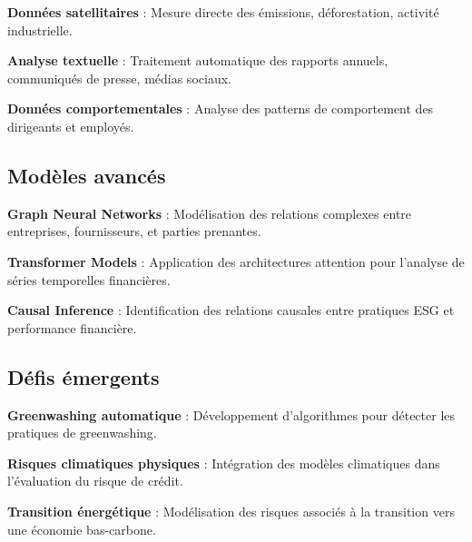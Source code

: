\textbf{Données satellitaires} : Mesure directe des émissions, déforestation, activité industrielle.

\textbf{Analyse textuelle} : Traitement automatique des rapports annuels, communiqués de presse, médias sociaux.

\textbf{Données comportementales} : Analyse des patterns de comportement des dirigeants et employés.

\subsection{Modèles avancés}

\textbf{Graph Neural Networks} : Modélisation des relations complexes entre entreprises, fournisseurs, et parties prenantes.

\textbf{Transformer Models} : Application des architectures attention pour l'analyse de séries temporelles financières.

\textbf{Causal Inference} : Identification des relations causales entre pratiques ESG et performance financière.

\subsection{Défis émergents}

\textbf{Greenwashing automatique} : Développement d'algorithmes pour détecter les pratiques de greenwashing.

\textbf{Risques climatiques physiques} : Intégration des modèles climatiques dans l'évaluation du risque de crédit.

\textbf{Transition énergétique} : Modélisation des risques associés à la transition vers une économie bas-carbone.